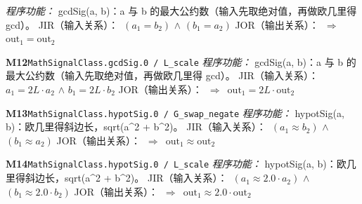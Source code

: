 \documentclass[11pt]{article}
\begin{document}
\hspace*{1.5em}\emph{程序功能：} gcdSig(a, b)：\textbar{}a\textbar{} 与 \textbar{}b\textbar{} 的最大公约数（输入先取绝对值，再做欧几里得 gcd）。\newline
\hspace*{1.5em}JIR（输入关系）：\ $(a_{1} = b_{2})$ $\wedge$ $(b_{1} = a_{2})$\newline
\hspace*{1.5em}JOR（输出关系）：\ $\Rightarrow$\ $\mathrm{out}_{1} = \mathrm{out}_{2}$\par\medskip
\textbf{M12}\quad \texttt{MathSignalClass.gcdSig.0 / L\_scale}\newline
\hspace*{1.5em}\emph{程序功能：} gcdSig(a, b)：\textbar{}a\textbar{} 与 \textbar{}b\textbar{} 的最大公约数（输入先取绝对值，再做欧几里得 gcd）。\newline
\hspace*{1.5em}JIR（输入关系）：\ $a_{1} = 2L\cdot a_{2}$ $\wedge$ $b_{1} = 2L\cdot b_{2}$\newline
\hspace*{1.5em}JOR（输出关系）：\ $\Rightarrow$\ $\mathrm{out}_{1} = 2L\cdot \mathrm{out}_{2}$\par\medskip
\textbf{M13}\quad \texttt{MathSignalClass.hypotSig.0 / G\_swap\_negate}\newline
\hspace*{1.5em}\emph{程序功能：} hypotSig(a, b)：欧几里得斜边长，sqrt(a\textasciicircum{}2 + b\textasciicircum{}2)。\newline
\hspace*{1.5em}JIR（输入关系）：\ $(a_{1} \approx  b_{2})$ $\wedge$ $(b_{1} \approx  a_{2})$\newline
\hspace*{1.5em}JOR（输出关系）：\ $\Rightarrow$\ $\mathrm{out}_{1} \approx  \mathrm{out}_{2}$\par\medskip
\textbf{M14}\quad \texttt{MathSignalClass.hypotSig.0 / L\_scale}\newline
\hspace*{1.5em}\emph{程序功能：} hypotSig(a, b)：欧几里得斜边长，sqrt(a\textasciicircum{}2 + b\textasciicircum{}2)。\newline
\hspace*{1.5em}JIR（输入关系）：\ $(a_{1} \approx  2.0\cdot a_{2})$ $\wedge$ $(b_{1} \approx  2.0\cdot b_{2})$\newline
\hspace*{1.5em}JOR（输出关系）：\ $\Rightarrow$\ $\mathrm{out}_{1} \approx  2.0\cdot \mathrm{out}_{2}$\par\medskip
\end{document}
